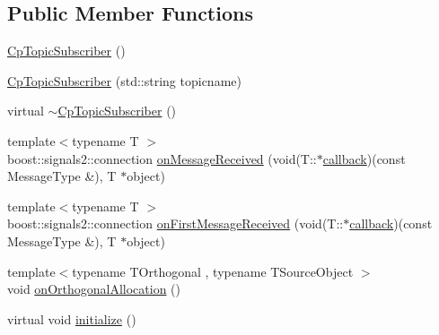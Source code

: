 \subsection*{Public Member Functions}
\begin{DoxyCompactItemize}
\item 
\hyperlink{classsmacc_1_1components_1_1CpTopicSubscriber_aeb25b3a5d149c6256e35bc4049cc0b6f}{Cp\+Topic\+Subscriber} ()
\item 
\hyperlink{classsmacc_1_1components_1_1CpTopicSubscriber_a331fb12e76c4c9e26f88a6cbb5c6f8cd}{Cp\+Topic\+Subscriber} (std\+::string topicname)
\item 
virtual \hyperlink{classsmacc_1_1components_1_1CpTopicSubscriber_a82118e72ea660b4f651dd02f8caf51a5}{$\sim$\+Cp\+Topic\+Subscriber} ()
\item 
{\footnotesize template$<$typename T $>$ }\\boost\+::signals2\+::connection \hyperlink{classsmacc_1_1components_1_1CpTopicSubscriber_af8f626a4ef4aa6ff699359f136372292}{on\+Message\+Received} (void(T\+::$\ast$\hyperlink{sm__ridgeback__barrel__search__2_2servers_2opencv__perception__node_2opencv__perception__node_8cpp_a050e697bd654facce10ea3f6549669b3}{callback})(const Message\+Type \&), T $\ast$object)
\item 
{\footnotesize template$<$typename T $>$ }\\boost\+::signals2\+::connection \hyperlink{classsmacc_1_1components_1_1CpTopicSubscriber_ac7b226871cec5c4358cc635e02f56bf2}{on\+First\+Message\+Received} (void(T\+::$\ast$\hyperlink{sm__ridgeback__barrel__search__2_2servers_2opencv__perception__node_2opencv__perception__node_8cpp_a050e697bd654facce10ea3f6549669b3}{callback})(const Message\+Type \&), T $\ast$object)
\item 
{\footnotesize template$<$typename T\+Orthogonal , typename T\+Source\+Object $>$ }\\void \hyperlink{classsmacc_1_1components_1_1CpTopicSubscriber_a7ed50caff06e266a4df299a58fdf5ba0}{on\+Orthogonal\+Allocation} ()
\item 
virtual void \hyperlink{classsmacc_1_1components_1_1CpTopicSubscriber_a12a86f96d939cfa509181865d6ec85e9}{initialize} ()
\end{DoxyCompactItemize}
